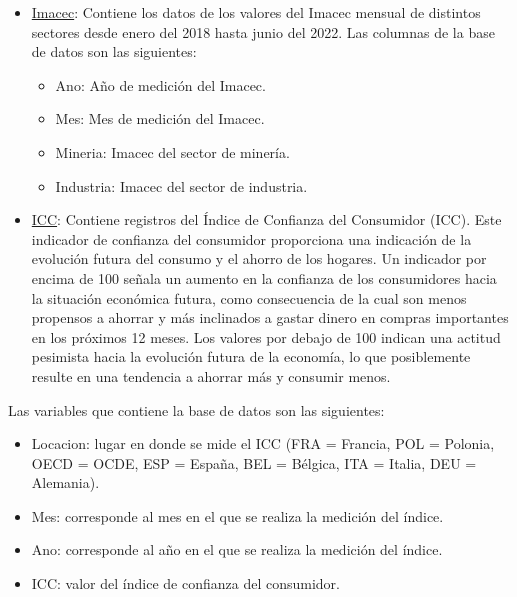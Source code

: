 \documentclass[
  11pt,
]{book}
\providecommand{\tightlist}{%
  \setlength{\itemsep}{0pt}\setlength{\parskip}{0pt}}
\theoremstyle{definition}
\theoremstyle{definition}
\theoremstyle{definition}
\theoremstyle{definition}
\theoremstyle{remark}
\begin{document}
\begin{itemize}
\item
  \label{Imacec2}\href{https://raw.githubusercontent.com/Dfranzani/Bases-de-datos-para-cursos/main/2022-2/Estad\%C3\%ADstica\%201/imacec.csv}{Imacec}: Contiene los datos de los valores del Imacec mensual de distintos sectores desde enero del 2018 hasta junio del 2022. Las columnas de la base de datos son las siguientes:

  \begin{itemize}
  \tightlist
  \item
    Ano: Año de medición del Imacec.
  \item
    Mes: Mes de medición del Imacec.
  \item
    Mineria: Imacec del sector de minería.
  \item
    Industria: Imacec del sector de industria.
  \end{itemize}
\item
  \label{ICC}\href{https://raw.githubusercontent.com/Dfranzani/Bases-de-datos-para-cursos/main/2022-2/Estad\%C3\%ADstica\%202/consumidor.csv}{ICC}: Contiene registros del Índice de Confianza del Consumidor (ICC). Este indicador de confianza del consumidor proporciona una indicación de la evolución futura del consumo y el ahorro de los hogares. Un indicador por encima de 100 señala un aumento en la confianza de los consumidores hacia la situación económica futura, como consecuencia de la cual son menos propensos a ahorrar y más inclinados a gastar dinero en compras importantes en los próximos 12 meses. Los valores por debajo de 100 indican una actitud pesimista hacia la evolución futura de la economía, lo que posiblemente resulte en una tendencia a ahorrar más y consumir menos.
\end{itemize}

Las variables que contiene la base de datos son las siguientes:

\begin{itemize}
\tightlist
\item
  Locacion: lugar en donde se mide el ICC (FRA = Francia, POL = Polonia, OECD = OCDE, ESP = España, BEL = Bélgica, ITA = Italia, DEU = Alemania).
\item
  Mes: corresponde al mes en el que se realiza la medición del índice.
\item
  Ano: corresponde al año en el que se realiza la medición del índice.
\item
  ICC: valor del índice de confianza del consumidor.
\end{itemize}
\end{document}
